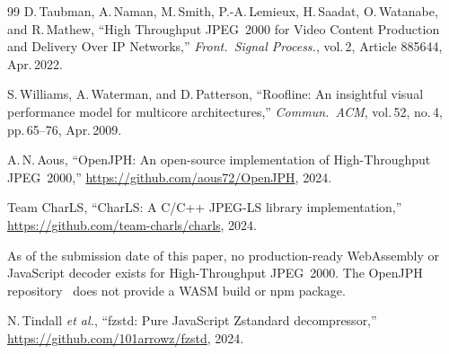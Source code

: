 \documentclass[10pt,twocolumn]{article}
\begin{document}
\begin{thebibliography}{99}
D.\,Taubman, A.\,Naman, M.\,Smith, P.-A.\,Lemieux, H.\,Saadat, O.\,Watanabe,
and R.\,Mathew,
``High Throughput JPEG~2000 for Video Content Production and Delivery Over IP
Networks,''
\textit{Front.\ Signal Process.}, vol.\,2, Article 885644, Apr.\,2022.

S.\,Williams, A.\,Waterman, and D.\,Patterson,
``Roofline: An insightful visual performance model for multicore
architectures,''
\textit{Commun.\ ACM}, vol.\,52, no.\,4, pp.\,65--76, Apr.\,2009.

A.\,N.\,Aous,
``OpenJPH: An open-source implementation of High-Throughput JPEG~2000,''
\url{https://github.com/aous72/OpenJPH}, 2024.

Team CharLS,
``CharLS: A C/C++ JPEG-LS library implementation,''
\url{https://github.com/team-charls/charls}, 2024.

As of the submission date of this paper, no production-ready WebAssembly or
JavaScript decoder exists for High-Throughput JPEG~2000. The OpenJPH
repository~\cite{openjph} does not provide a WASM build or npm package.

N.\,Tindall \textit{et al.},
``fzstd: Pure JavaScript Zstandard decompressor,''
\url{https://github.com/101arrowz/fzstd}, 2024.

\end{thebibliography}
\end{document}
